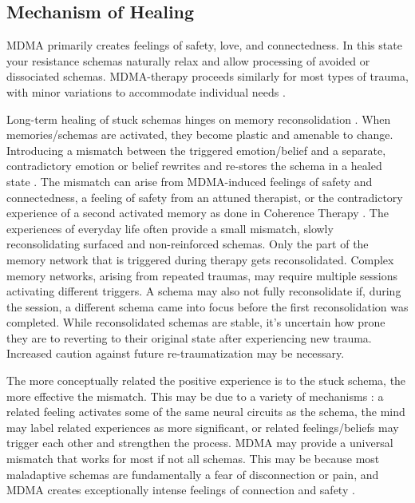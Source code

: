 \documentclass[12pt,letterpaper]{article}
\begin{document}
\subsection{Mechanism of Healing}
MDMA primarily creates feelings of safety, love, and connectedness. In this state your resistance schemas naturally relax and allow processing of avoided or dissociated schemas. MDMA-therapy proceeds similarly for most types of trauma, with minor variations to accommodate individual needs \cite{otaloraMDMA}. 

Long-term healing of stuck schemas hinges on memory reconsolidation \cite{fedduciaMDMAMemoryReconsolidation}. When memories/schemas are activated, they become plastic and amenable to change. Introducing a mismatch between the triggered emotion/belief and a separate, contradictory emotion or belief rewrites and re-stores the schema in a healed state \cite{laneReconsolidation}. The mismatch can arise from MDMA-induced feelings of safety and connectedness, a feeling of safety from an attuned therapist, or the contradictory experience of a second activated memory as done in Coherence Therapy \cite{eckerUnlocking}. The experiences of everyday life often provide a small mismatch, slowly reconsolidating surfaced and non-reinforced schemas. Only the part of the memory network that is triggered during therapy gets reconsolidated. Complex memory networks, arising from repeated traumas, may require multiple sessions activating different triggers. A schema may also not fully reconsolidate if, during the session, a different schema came into focus before the first reconsolidation was completed. While reconsolidated schemas are stable, it's uncertain how prone they are to reverting to their original state after experiencing new trauma. Increased caution against future re-traumatization may be necessary. 

The more conceptually related the positive experience is to the stuck schema, the more effective the mismatch. This may be due to a variety of mechanisms : a related feeling activates some of the same neural circuits as the schema, the mind may label related experiences as more significant, or related feelings/beliefs may trigger each other and strengthen the process. MDMA may provide a universal mismatch that works for most if not all schemas. This may be because most maladaptive schemas are fundamentally a fear of disconnection or pain, and MDMA creates exceptionally intense feelings of connection and safety \cite{brownDaring}.
\end{document}

